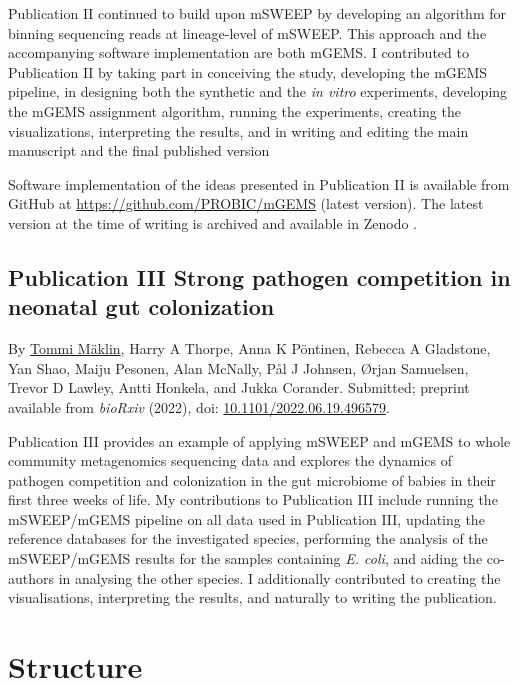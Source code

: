 \documentclass[officiallayout]{tktla}
\begin{document}
Publication II \citep{maklin_bacterial_2021} continued to build upon
mSWEEP by developing an algorithm for binning sequencing reads at
lineage-level of mSWEEP. This approach and the accompanying software
implementation are both mGEMS. I contributed to Publication II by
taking part in conceiving the study, developing the mGEMS pipeline, in
designing both the synthetic and the \textit{in vitro} experiments,
developing the mGEMS assignment algorithm, running the experiments,
creating the visualizations, interpreting the results, and in writing
and editing the main manuscript and the final published version

Software implementation of the ideas presented in Publication II is
available from GitHub at
\href{https://github.com/PROBIC/mGEMS}{https://github.com/PROBIC/mGEMS} (latest version).
The latest version at the time of writing is archived and available in
Zenodo \citep{maklin_mGEMS}.

\subsection*{Publication III \textemdash{ } Strong pathogen competition in neonatal gut colonization}
By \underline{Tommi M\"aklin}, Harry A Thorpe, Anna K P\"ontinen, Rebecca
A Gladstone, Yan Shao, Maiju Pesonen, Alan McNally, P\aa l J Johnsen,
\O rjan Samuelsen, Trevor D Lawley, Antti Honkela, and Jukka
Corander. Submitted; preprint available from \textit{bioRxiv} (2022),
doi: \href{https://doi.org/10.1101/2022.06.19.496579}{10.1101/2022.06.19.496579}.

Publication III \citep{maklin_strong_2022} provides an example of
applying mSWEEP and mGEMS to whole community metagenomics
sequencing data and explores the dynamics of pathogen competition and
colonization in the gut microbiome of babies in their first three
weeks of life. My contributions to Publication III include running the
mSWEEP/mGEMS pipeline on all data used in Publication III, updating the
reference databases for the investigated species, performing the
analysis of the mSWEEP/mGEMS results for the samples containing
\textit{E. coli}, and aiding the co-authors in analysing the other
species. I additionally contributed to creating the visualisations,
interpreting the results, and naturally to writing the publication.

\section{Structure}
\end{document}
